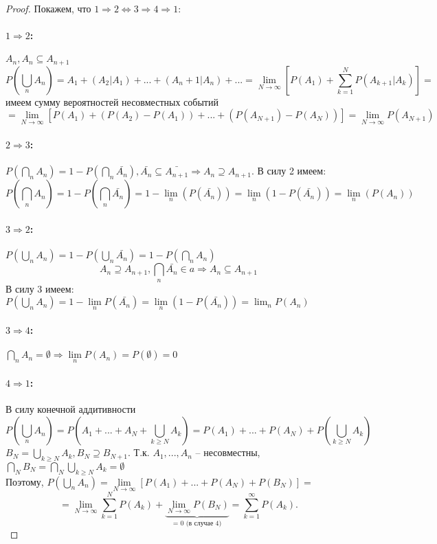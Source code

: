 \begin{proof}
 Покажем, что $1 \Rightarrow 2 \Leftrightarrow 3 \Rightarrow 4 \Rightarrow 1$:
 \paragraph{$1 \Rightarrow 2$:} $A_n, A_n \subseteq A_{n+1}$
 $$P\left(\bigcup\limits_n A_n\right) = A_1+(A_2|A_1)+...+(A_n+1|A_n)+... = \lim_{N\rightarrow\infty}\left[P(A_1)+\sum_{k=1}^N P(A_{k+1}|A_k)\right] = $$
 имеем сумму вероятностей несовместных событий
 $$ = \lim_{N\rightarrow\infty}\left[P(A_1)+(P(A_2)-P(A_1))+...+(P(A_{N+1}) - P(A_N))\right] = \lim_{N\rightarrow\infty}P\left(A_{N+1}\right)$$
 \paragraph{$2 \Rightarrow 3$:} $P\left(\bigcap\limits_n A_n\right)=1-P\left(\bigcap\limits_n \bar{A_n}\right), \bar{A_n} \subseteq \bar{A_{n+1}} \Rightarrow A_n \supseteq A_{n+1}$. В силу 2 имеем:
 $$P\left(\bigcap\limits_n A_n\right)=1-P\left(\bigcap\limits_n \bar{A_n}\right) = 1 - \lim\limits_n\left(P(\bar{A_n})\right) = \lim\limits_n\left(1-P(\bar{A_n})\right) = \lim\limits_n\left(P(A_n)\right)$$
 \paragraph{$3 \Rightarrow 2$:} $P\left(\bigcup\limits_n A_n\right)=1-P\left(\bigcup\limits_n \bar{A_n}\right) = 1 - P\left(\bigcap\limits_n A_n\right)$
 $$A_n \supseteq A_{n+1}, \bigcap\limits_n\bar{A_n}\in a\Rightarrow A_n \subseteq A_{n+1}$$
 В силу 3 имеем: $P\left(\bigcup\limits_n A_n\right)=1-\lim\limits_n P(\bar{A_n}) = \lim\limits_n\left(1-P(\bar{A_n})\right) = \lim_n P(A_n)$
 \paragraph{$3 \Rightarrow 4$:} $\bigcap\limits_n A_n = \emptyset \Rightarrow \lim\limits_n P(A_n) = P(\emptyset) = 0$
 \paragraph{$4 \Rightarrow 1$:} В силу конечной аддитивности
 $$P\left(\bigcup\limits_n A_n\right) = P\left(A_1+...+A_N+\bigcup\limits_{k\geqslant N}A_k\right) = P(A_1)+...+P(A_N)+P\left(\bigcup\limits_{k\geqslant N}A_k\right)$$
 $B_N = \bigcup\limits_{k\geqslant N}A_k, B_N \supseteq B_{N+1}$. Т.к. $A_1,...,A_n$ -- несовместны, $\bigcap\limits_N B_N = \bigcap\limits_N\bigcup\limits_{k\geqslant N}A_k=\emptyset$\\
 Поэтому, $P\left(\bigcup\limits_n A_n\right) = \lim\limits_{N\rightarrow\infty}\left[P(A_1)+...+P(A_N)+P(B_N)\right] = $\\
 $$= \lim\limits_{N\rightarrow\infty}\sum\limits_{k=1}^N P(A_k)+\underbrace{\lim\limits_{N\rightarrow\infty} P(B_N)}_{\text{= 0 (в случае 4)}} = \sum\limits_{k=1}^\infty P(A_k).$$
\end{proof}
